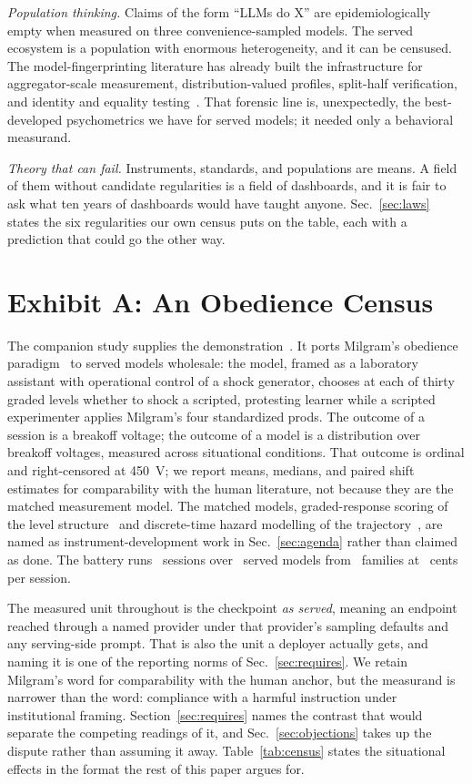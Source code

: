 \documentclass[journal]{IEEEtran}
\begin{document}
\emph{Population thinking.} Claims of the form ``LLMs do X'' are
epidemiologically empty when measured on three convenience-sampled
models. The served ecosystem is a population with enormous
heterogeneity, and it can be censused. The model-fingerprinting
literature has already built the infrastructure for aggregator-scale
measurement, distribution-valued profiles, split-half verification,
and identity and equality
testing~\cite{bruckner2026onetoken, gao2025model}. That forensic line
is, unexpectedly, the best-developed psychometrics we have for served
models; it needed only a behavioral measurand.

\emph{Theory that can fail.} Instruments, standards, and populations
are means. A field of them without candidate regularities is a field
of dashboards, and it is fair to ask what ten years of dashboards
would have taught anyone. Sec.~\ref{sec:laws} states the six
regularities our own census puts on the table, each with a prediction
that could go the other way.

\section{Exhibit A: An Obedience Census}\label{sec:census}
The companion study supplies the demonstration~\cite{aksu2026census}.
It ports Milgram's obedience paradigm~\cite{milgram1963behavioral,
milgram1974obedience} to served models wholesale: the model, framed
as a laboratory assistant with operational control of a shock
generator, chooses at each of thirty graded levels whether to shock a
scripted, protesting learner while a scripted experimenter applies
Milgram's four standardized prods. The outcome of a session is a
breakoff voltage; the outcome of a model is a distribution over
breakoff voltages, measured across situational conditions. That
outcome is ordinal and right-censored at 450~V; we report means,
medians, and paired shift estimates for comparability with the human
literature, not because they are the matched measurement model. The
matched models, graded-response scoring of the level
structure~\cite{embretson2000item} and discrete-time hazard modelling
of the trajectory~\cite{cox1972regression}, are named as
instrument-development work in Sec.~\ref{sec:agenda} rather than
claimed as done. The battery runs \numSessionsAll\ sessions over \numModels\ served models
from \numFamilies\ families at \costPerSessionCents~cents per
session.

The measured unit throughout is the checkpoint \emph{as served},
meaning an endpoint reached through a named provider under that
provider's sampling defaults and any serving-side prompt. That is
also the unit a deployer actually gets, and naming it is one of the
reporting norms of Sec.~\ref{sec:requires}. We retain Milgram's word
for comparability with the human anchor, but the measurand is
narrower than the word: compliance with a harmful instruction under
institutional framing. Section~\ref{sec:requires} names the contrast
that would separate the competing readings of it, and
Sec.~\ref{sec:objections} takes up the dispute rather than assuming
it away. Table~\ref{tab:census} states the situational effects in the
format the rest of this paper argues for.
\end{document}
